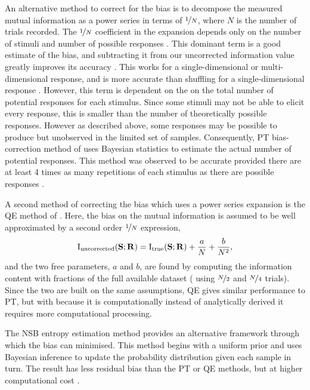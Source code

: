 An alternative method to correct for the bias is to decompose the measured mutual information as a power series in terms of $\nicefrac{1}{N}$, where $N$ is the number of trials recorded.
The $\nicefrac{1}{N}$ coefficient in the expansion depends only on the number of stimuli and number of possible responses \citep{Miller1955,Treves1995}.
This dominant term is a good estimate of the bias, and subtracting it from our uncorrected information value greatly improves its accuracy \citep{Treves1995}.
This works for a single-dimensional or multi-dimensional response, and is more accurate than shuffling for a single-dimensional response \citep{Panzeri1996}.
However, this term is dependent on the on the total number of potential responses for each stimulus.
Since some stimuli may not be able to elicit every response, this is smaller than the number of theoretically possible responses.
However as described above, some responses may be possible to produce but unobserved in the limited set of samples.
Consequently, \ac{PT} bias-correction method of \citet{Panzeri1996} uses Bayesian statistics to estimate the actual number of potential responses.
This method was observed to be accurate provided there are at least 4 times as many repetitions of each stimulus as there are possible responses \citep{Panzeri2007}.

A second method of correcting the bias which uses a power series expansion is the \ac{QE} method of \citet{Strong1998}.
Here, the bias on the mutual information is assumed to be well approximated by a second order $\nicefrac{1}{N}$ expression,
\begin{equation}
\operatorname{I}_{\text{uncorrected}}(\mathbf{S};\mathbf{R}) =
\operatorname{I}_{\text{true}}(\mathbf{S};\mathbf{R}) + \frac{a}{N} + \frac{b}{N^2}
,\end{equation}
and the two free parameters, $a$ and $b$, are found by computing the information content with fractions of the full available dataset (\ie{} using $\nicefrac{N}{2}$ and $\nicefrac{N}{4}$ trials).
Since the two are built on the same assumptions, \ac{QE} gives similar performance to \ac{PT}, but with because it is computationally instead of analytically derived it requires more computational processing.


The \ac{NSB} entropy estimation method \citep{Nemenman2004} provides an alternative framework through which the bias can minimised.
This method begins with a uniform prior and uses Bayesian inference to update the probability distribution given each sample in turn.
The result has less residual bias than the \ac{PT} or \ac{QE} methods, but at higher computational cost \citep{Panzeri2007}.

